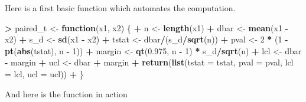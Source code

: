 \documentclass[]{krantz}
\makeatletter
\newenvironment{Shaded}{\begin{snugshade}}{\end{snugshade}}
\newcommand{\ControlFlowTok}[1]{\textcolor[rgb]{0.27,0.27,0.27}{\textbf{#1}}}
\newcommand{\DataTypeTok}[1]{\textcolor[rgb]{0.27,0.27,0.27}{#1}}
\newcommand{\DecValTok}[1]{\textcolor[rgb]{0.06,0.06,0.06}{#1}}
\newcommand{\FloatTok}[1]{\textcolor[rgb]{0.06,0.06,0.06}{#1}}
\newcommand{\KeywordTok}[1]{\textcolor[rgb]{0.27,0.27,0.27}{\textbf{#1}}}
\newcommand{\NormalTok}[1]{#1}
\newcommand{\OperatorTok}[1]{\textcolor[rgb]{0.43,0.43,0.43}{\textbf{#1}}}
\newcommand{\StringTok}[1]{\textcolor[rgb]{0.5,0.5,0.5}{#1}}
\newenvironment{kframe}{%
\medskip{}
\setlength{\fboxsep}{.8em}
 \def\at@end@of@kframe{}%
 \ifinner\ifhmode%
  \def\at@end@of@kframe{\end{minipage}}%
  \begin{minipage}{\columnwidth}%
 \fi\fi%
 \def\FrameCommand##1{\hskip\@totalleftmargin \hskip-\fboxsep
 \colorbox{shadecolor}{##1}\hskip-\fboxsep
     \hskip-\linewidth \hskip-\@totalleftmargin \hskip\columnwidth}%
 \MakeFramed {\advance\hsize-\width
   \@totalleftmargin\z@ \linewidth\hsize
   \@setminipage}}%
 {\par\unskip\endMakeFramed%
 \at@end@of@kframe}
\renewenvironment{Shaded}{\begin{kframe}}{\end{kframe}}
\makeatother
\begin{document}
Here is a first basic function which automates the computation.

\begin{Shaded}
\begin{Highlighting}[]
\OperatorTok{>}\StringTok{ }\NormalTok{paired_t <-}\StringTok{ }\ControlFlowTok{function}\NormalTok{(x1, x2) \{}
\OperatorTok{+}\StringTok{   }\NormalTok{n <-}\StringTok{ }\KeywordTok{length}\NormalTok{(x1)}
\OperatorTok{+}\StringTok{   }\NormalTok{dbar <-}\StringTok{ }\KeywordTok{mean}\NormalTok{(x1 }\OperatorTok{-}\StringTok{ }\NormalTok{x2)}
\OperatorTok{+}\StringTok{   }\NormalTok{s_d <-}\StringTok{ }\KeywordTok{sd}\NormalTok{(x1 }\OperatorTok{-}\StringTok{ }\NormalTok{x2)}
\OperatorTok{+}\StringTok{   }\NormalTok{tstat <-}\StringTok{ }\NormalTok{dbar}\OperatorTok{/}\NormalTok{(s_d}\OperatorTok{/}\KeywordTok{sqrt}\NormalTok{(n))}
\OperatorTok{+}\StringTok{   }\NormalTok{pval <-}\StringTok{ }\DecValTok{2} \OperatorTok{*}\StringTok{ }\NormalTok{(}\DecValTok{1} \OperatorTok{-}\StringTok{ }\KeywordTok{pt}\NormalTok{(}\KeywordTok{abs}\NormalTok{(tstat), n }\OperatorTok{-}\StringTok{ }\DecValTok{1}\NormalTok{))}
\OperatorTok{+}\StringTok{   }\NormalTok{margin <-}\StringTok{ }\KeywordTok{qt}\NormalTok{(}\FloatTok{0.975}\NormalTok{, n }\OperatorTok{-}\StringTok{ }\DecValTok{1}\NormalTok{) }\OperatorTok{*}\StringTok{ }\NormalTok{s_d}\OperatorTok{/}\KeywordTok{sqrt}\NormalTok{(n)}
\OperatorTok{+}\StringTok{   }\NormalTok{lcl <-}\StringTok{ }\NormalTok{dbar }\OperatorTok{-}\StringTok{ }\NormalTok{margin}
\OperatorTok{+}\StringTok{   }\NormalTok{ucl <-}\StringTok{ }\NormalTok{dbar }\OperatorTok{+}\StringTok{ }\NormalTok{margin}
\OperatorTok{+}\StringTok{   }\KeywordTok{return}\NormalTok{(}\KeywordTok{list}\NormalTok{(}\DataTypeTok{tstat =}\NormalTok{ tstat, }\DataTypeTok{pval =}\NormalTok{ pval, }\DataTypeTok{lcl =}\NormalTok{ lcl, }\DataTypeTok{ucl =}\NormalTok{ ucl))}
\OperatorTok{+}\StringTok{ }\NormalTok{\}}
\end{Highlighting}
\end{Shaded}

And here is the function in action

\begin{Shaded}
\end{Shaded}
\end{document}
